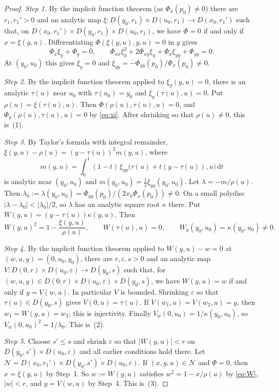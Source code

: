 \documentclass[11pt]{amsart}
\theoremstyle{definition}
\theoremstyle{remark}
\numberwithin{equation}{section}
\newcommand{\cN}{\mathcal{N}}
\newcommand{\abs}[1]{\lvert #1\rvert}
\newcommand{\dd}{\mathrm{d}}
\begin{document}
\begin{proof}
\emph{Step 1.} By the implicit function theorem (as \(\Phi_x(p_0)\ne0\)) there are \(r_1,r_1'>0\) and an analytic map \(\xi\colon D(y_0,r_1)\times D(u_0,r_1)\to D(x_0,r_1')\) such that, on \(D(x_0,r_1')\times D(y_0,r_1)\times D(u_0,r_1)\), we have \(\Phi=0\) if and only if \(x=\xi(y,u)\). Differentiating \(\Phi(\xi(y,u),y,u)=0\) in \(y\) gives
\begin{equation}\label{eq:xi}
\Phi_x\xi_y+\Phi_y=0,\qquad\Phi_{xx}\xi_y^2+2\Phi_{xy}\xi_y+\Phi_x\xi_{yy}+\Phi_{yy}=0 .
\end{equation}
At \((y_0,u_0)\) this gives \(\xi_y=0\) and \(\xi_{yy}=-\Phi_{yy}(p_0)/\Phi_x(p_0)\ne0\).

\emph{Step 2.} By the implicit function theorem applied to \(\xi_y(y,u)=0\), there is an analytic \(\tau(u)\) near \(u_0\) with \(\tau(u_0)=y_0\) and \(\xi_y(\tau(u),u)=0\). Put \(\rho(u)=\xi(\tau(u),u)\). Then \(\Phi(\rho(u),\tau(u),u)=0\), and \(\Phi_y(\rho(u),\tau(u),u)=0\) by \eqref{eq:xi}. After shrinking so that \(\rho(u)\ne0\), this is~(1).

\emph{Step 3.} By Taylor's formula with integral remainder, \(\xi(y,u)-\rho(u)=(y-\tau(u))^2m(y,u)\), where
\[
m(y,u)=\int_0^1(1-t)\,\xi_{yy}\bigl(\tau(u)+t(y-\tau(u)),u\bigr)\,\dd t
\]
is analytic near \((y_0,u_0)\) and \(m(y_0,u_0)=\frac12\xi_{yy}(y_0,u_0)\). Let \(\lambda=-m/\rho(u)\). Then \(\lambda_0:=\lambda(y_0,u_0)=\Phi_{yy}(p_0)/(2x_0\Phi_x(p_0))\ne0\). On a small polydisc \(\abs{\lambda-\lambda_0}<\abs{\lambda_0}/2\), so \(\lambda\) has an analytic square root \(\kappa\) there. Put \(W(y,u)=(y-\tau(u))\kappa(y,u)\). Then
\begin{equation}\label{eq:W}
W(y,u)^2=1-\frac{\xi(y,u)}{\rho(u)},\qquad W(\tau(u),u)=0,\qquad W_y(y_0,u_0)=\kappa(y_0,u_0)\ne0 .
\end{equation}

\emph{Step 4.} By the implicit function theorem applied to \(W(y,u)-w=0\) at \((w,u,y)=(0,u_0,y_0)\), there are \(r,\varepsilon,s>0\) and an analytic map \(V\colon D(0,r)\times D(u_0,\varepsilon)\to D(y_0,s)\) such that, for \((w,u,y)\in D(0,r)\times D(u_0,\varepsilon)\times D(y_0,s)\), we have \(W(y,u)=w\) if and only if \(y=V(w,u)\). In particular \(V\) is bounded. Shrinking \(\varepsilon\) so that \(\tau(u)\in D(y_0,s)\) gives \(V(0,u)=\tau(u)\). If \(V(w_1,u)=V(w_2,u)=y\), then \(w_1=W(y,u)=w_2\); this is injectivity. Finally \(V_w(0,u_0)=1/\kappa(y_0,u_0)\), so \(V_w(0,u_0)^2=1/\lambda_0\). This is~(2).

\emph{Step 5.} Choose \(s'\le s\) and shrink \(\varepsilon\) so that \(\abs{W(y,u)}<r\) on \(D(y_0,s')\times D(u_0,\varepsilon)\) and all earlier conditions hold there. Let \(\cN=D(x_0,r_1')\times D(y_0,s')\times D(u_0,\varepsilon)\). If \((x,y,u)\in\cN\) and \(\Phi=0\), then \(x=\xi(y,u)\) by Step~1. So \(w:=W(y,u)\) satisfies \(w^2=1-x/\rho(u)\) by \eqref{eq:W}, \(\abs{w}<r\), and \(y=V(w,u)\) by Step~4. This is~(3).


\end{proof}
\end{document}
